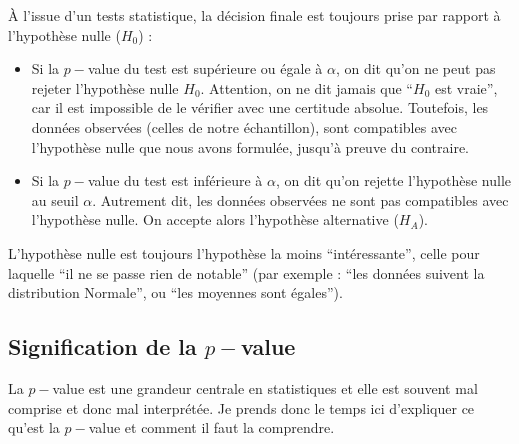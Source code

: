 \documentclass[
  french,
  a4paper,
  DIV=11,
  numbers=noendperiod,
  oneside]{scrreprt}
\providecommand{\tightlist}{%
  \setlength{\itemsep}{0pt}\setlength{\parskip}{0pt}}
\begin{document}
\begin{tcolorbox}[enhanced jigsaw, arc=.35mm, bottomrule=.15mm, bottomtitle=1mm, breakable, colback=white, colbacktitle=quarto-callout-warning-color!10!white, colframe=quarto-callout-warning-color-frame, coltitle=black, left=2mm, leftrule=.75mm, opacityback=0, opacitybacktitle=0.6, rightrule=.15mm, title=\textcolor{quarto-callout-warning-color}{\faExclamationTriangle}\hspace{0.5em}{Tests et décision : rappel de cours}, titlerule=0mm, toprule=.15mm, toptitle=1mm]

À l'issue d'un tests statistique, la décision finale est toujours prise
par rapport à l'hypothèse nulle (\(H_0\)) :

\begin{itemize}
\tightlist
\item
  Si la \(p-\)value du test est supérieure ou égale à \(\alpha\), on dit
  qu'on ne peut pas rejeter l'hypothèse nulle \(H_0\). Attention, on ne
  dit jamais que ``\(H_0\) est vraie'', car il est impossible de le
  vérifier avec une certitude absolue. Toutefois, les données observées
  (celles de notre échantillon), sont compatibles avec l'hypothèse nulle
  que nous avons formulée, jusqu'à preuve du contraire.
\item
  Si la \(p-\)value du test est inférieure à \(\alpha\), on dit qu'on
  rejette l'hypothèse nulle au seuil \(\alpha\). Autrement dit, les
  données observées ne sont pas compatibles avec l'hypothèse nulle. On
  accepte alors l'hypothèse alternative (\(H_A\)).
\end{itemize}

L'hypothèse nulle est toujours l'hypothèse la moins ``intéressante'',
celle pour laquelle ``il ne se passe rien de notable'' (par exemple :
``les données suivent la distribution Normale'', ou ``les moyennes sont
égales'').

\end{tcolorbox}

\subsection{\texorpdfstring{Signification de la
\(p-\)value}{Signification de la p-value}}\label{signification-de-la-p-value}

La \(p-\)value est une grandeur centrale en statistiques et elle est
souvent mal comprise et donc mal interprétée. Je prends donc le temps
ici d'expliquer ce qu'est la \(p-\)value et comment il faut la
comprendre.
\end{document}
